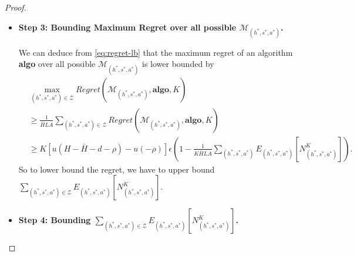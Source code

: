 \documentclass[11pt]{article}
\newcommand{\1}{\mathbbm{1}}
\begin{document}
\begin{proof}
\begin{itemize}
Therefore, the regret of a learning algorithm \textbf{algo} in $\mathcal{M}_{(h^*,s^*,a^*)}$ can be lower bounded as follow: 
\begin{align} \label{eq:regret-lb}
&Regret(\mathcal{M}_{(h^*,s^*,a^*)},\textbf{algo},K) \nonumber \\
&= \sum_{k=1}^K E_{(h^*,s^*,a^*)} [V_1^*(s_1^k)-V_1^{\pi^k}(s_1^k)] \nonumber \\
&\geq  \epsilon [u(H-\bar{H}-d-\rho)-u(-\rho)]\sum_{k=1}^K\left (1-P_{(h^*,s^*,a^*)}(s_{h^*}^k=s^*,a_{h^*}^k=a^*) \right ) \nonumber \\
&=  \epsilon [u(H-\bar{H}-d-\rho)-u(-\rho)]\left (K-E_{(h^*,s^*,a^*)}\left[N^K_{(h^*,s^*,a^*)}\right]\right ),
\end{align}
where 
\begin{align}\label{eq:N-star}
N^K_{(h^*,s^*,a^*)}=\sum_{k=1}^K 1\{s_{h^*}=s^*,a_{h^*}=a^*\}.
\end{align}


\item \textbf{Step 3: Bounding Maximum Regret over all possible $\mathcal{M}_{(h^*,s^*,a^*)}$.}

We can deduce from \eqref{eq:regret-lb} that
the maximum regret of an algorithm \textbf{algo} over all possible  $\mathcal{M}_{(h^*,s^*,a^*)}$ is lower bounded by 
\begin{equation}\label{S20}
\begin{aligned}
&\mathop{\max}_{(h^*,s^*,a^*) \in \mathcal{Z}} Regret(\mathcal{M}_{(h^*,s^*,a^*)},\textbf{algo},K)\\
&\geq \frac{1}{\bar{H}LA}\sum_{(h^*,s^*,a^*) \in \mathcal{Z}}Regret(\mathcal{M}_{(h^*,s^*,a^*)},\textbf{algo},K)\\
&\geq  K[u(H-\bar{H}-d-\rho)-u(-\rho)]\epsilon \left (1-\frac{1}{K\bar{H}LA}\sum_{(h^*,s^*,a^*)} E_{(h^*,s^*,a^*)}\left[N^K_{(h^*,s^*,a^*)}\right]\right ).
\end{aligned}
\end{equation}
So to lower bound the regret, we have to upper bound $\sum_{(h^*,s^*,a^*) \in \mathcal{Z} }E_{(h^*,s^*,a^*)} \left[N^K_{(h^*,s^*,a^*)}\right]$.

\item \textbf{Step 4: Bounding $\sum_{(h^*,s^*,a^*) \in \mathcal{Z} }E_{(h^*,s^*,a^*)}\left[N^K_{(h^*,s^*,a^*)}\right]$.}


\end{itemize}
\end{proof}
\end{document}

